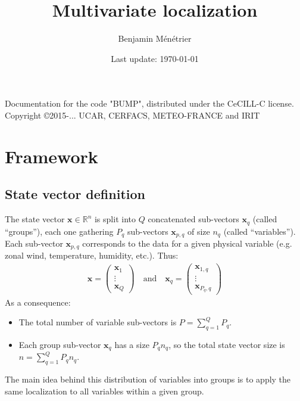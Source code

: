 \documentclass[12pt]{scrartcl}
\begin{document}
\title{Multivariate localization}
\author{Benjamin Ménétrier}
\date{Last update: \today}

\thispagestyle{empty}

\maketitle
\begin{center}
Documentation for the code "BUMP", distributed under the CeCILL-C license.\\
Copyright \copyright 2015-... UCAR, CERFACS, METEO-FRANCE and IRIT
\end{center}

\tableofcontents

\clearpage


\section{Framework}

\subsection{State vector definition}
The state vector $\mathbf{x} \in \mathbb{R}^n$ is split into $Q$ concatenated sub-vectors $\mathbf{x}_q$ (called ``groups''), each one gathering $P_q$ sub-vectors $\mathbf{x}_{p,q}$ of size $n_q$ (called ``variables''). Each sub-vector $\mathbf{x}_{p,q}$ corresponds to the data for a given physical variable (e.g. zonal wind, temperature, humidity, etc.). Thus:
\begin{align}
\mathbf{x} = \left( \begin{array}{c}
\mathbf{x}_1 \\[1ex]
\hline
\vdots \\
\hline
\mathbf{x}_Q
\end{array} \right) \quad \text{and} \quad \mathbf{x}_q = \left( \begin{array}{c}
\mathbf{x}_{1,q} \\[1ex]
\hline
\vdots \\
\hline
\mathbf{x}_{P_q,q}
\end{array} \right) 
\end{align}
As a consequence:
\begin{itemize}
\item The total number of variable sub-vectors is $\displaystyle P = \sum_{q=1}^Q P_q$.
\item Each group sub-vector $\mathbf{x}_q$ has a size $P_q n_q$, so the total state vector size is $n = \sum_{q=1}^Q P_q n_q$.
\end{itemize}
The main idea behind this distribution of variables into groups is to apply the same localization to all variables within a given group.\\
\end{document}

